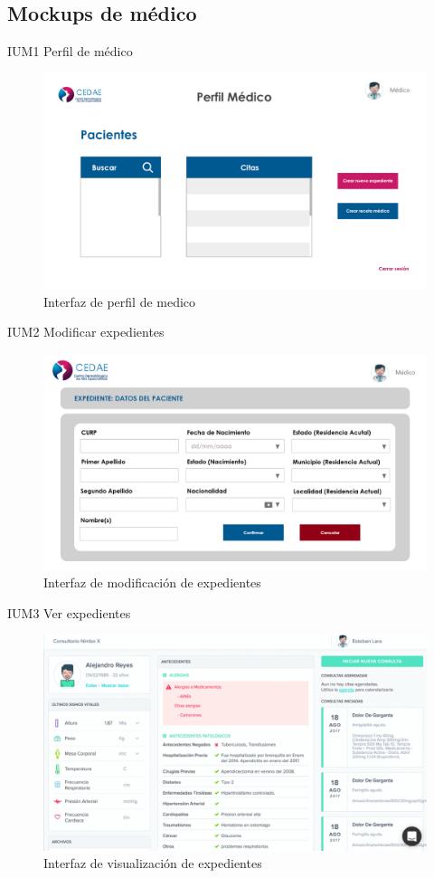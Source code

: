 \documentclass[12pt,letterpaper]{article}
\begin{document}
        \subsection{Mockups de médico}
        IUM1 Perfil de médico
            \begin{figure}[H]
                \centering
                \includegraphics [scale=0.18]{interfaces/med_perfil}
                \caption{Interfaz de perfil de medico}
            \end{figure}
        IUM2 Modificar expedientes
            \begin{figure}[H]
                \centering
                \includegraphics [scale=0.2]{interfaces/med_mod_expediente}
                \caption{Interfaz de modificación de expedientes}
            \end{figure}
        IUM3 Ver expedientes
            \begin{figure}[H]
                \centering
                \includegraphics [scale=0.2]{interfaces/med_ver_expediente}
                \caption{Interfaz de visualización de expedientes}
            \end{figure}
\end{document}
